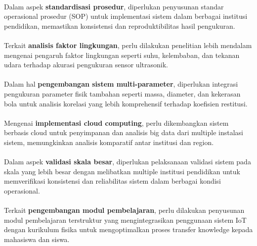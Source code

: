 \paragraph{}Dalam aspek \textbf{standardisasi prosedur}, diperlukan penyusunan standar operasional prosedur (SOP) untuk implementasi sistem dalam berbagai institusi pendidikan, memastikan konsistensi dan reproduktibilitas hasil pengukuran.

\paragraph{}Terkait \textbf{analisis faktor lingkungan}, perlu dilakukan penelitian lebih mendalam mengenai pengaruh faktor lingkungan seperti suhu, kelembaban, dan tekanan udara terhadap akurasi pengukuran sensor ultrasonik.

\paragraph{}Dalam hal \textbf{pengembangan sistem multi-parameter}, diperlukan integrasi pengukuran parameter fisik tambahan seperti massa, diameter, dan kekerasan bola untuk analisis korelasi yang lebih komprehensif terhadap koefisien restitusi.

\paragraph{}Mengenai \textbf{implementasi cloud computing}, perlu dikembangkan sistem berbasis cloud untuk penyimpanan dan analisis big data dari multiple instalasi sistem, memungkinkan analisis komparatif antar institusi dan region.

\paragraph{}Dalam aspek \textbf{validasi skala besar}, diperlukan pelaksanaan validasi sistem pada skala yang lebih besar dengan melibatkan multiple institusi pendidikan untuk memverifikasi konsistensi dan reliabilitas sistem dalam berbagai kondisi operasional.

\paragraph{}Terkait \textbf{pengembangan modul pembelajaran}, perlu dilakukan penyusunan modul pembelajaran terstruktur yang mengintegrasikan penggunaan sistem IoT dengan kurikulum fisika untuk mengoptimalkan proses transfer knowledge kepada mahasiswa dan siswa.

